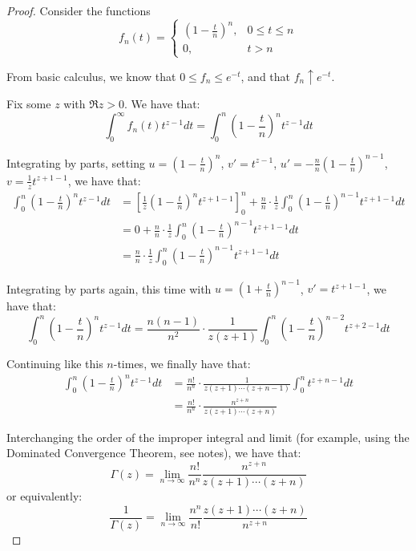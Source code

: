 \documentclass[11pt]{article} %
\theoremstyle{definition}
\theoremstyle{remark}
\begin{document}
\begin{proof}
Consider the functions
\[
f_n\left(t\right) =
\begin{cases}
\left(1-\frac{t}{n}\right)^n, & 0\leq t \leq n \\
0, & t > n
\end{cases}
\]

From basic calculus, we know that $0 \leq f_n \leq e^{-t}$, and that $f_n \uparrow e^{-t}$.

Fix some $z$ with $\Re z > 0$. We have that:
\[ \int _0^\infty f_n\left(t\right) t^{z-1} dt = \int_0^n \left(1- \frac{t}{n}\right)^n t^{z-1}dt \]

Integrating by parts, setting $u = \left(1 - \frac{t}{n}\right)^n$, $v' = t^{z-1}$, $u' = -\frac{n}{n}\left(1-\frac{t}{n}\right)^{n-1}$, $v = \frac{1}{z}t^{z+1-1}$, we have that:
\[
\begin{split}    
\int_0^n \left(1-\frac{t}{n}\right)^n t^{z-1} dt & = \left[\frac{1}{z}\left(1-\frac{t}{n}\right)^nt^{z+1 -1}\right]_0^n + \frac{n}{n}\cdot\frac{1}{z}\int_0^n \left(1-\frac{t}{n}\right)^{n-1}t^{z+1-1}dt \\
& = 0 + \frac{n}{n}\cdot\frac{1}{z}\int_0^n \left(1-\frac{t}{n}\right)^{n-1}t^{z+1-1}dt \\
& = \frac{n}{n}\cdot\frac{1}{z}\int_0^n \left(1-\frac{t}{n}\right)^{n-1}t^{z+1-1}dt
\end{split}
\]

Integrating by parts again, this time with $u = \left(1 + \frac{t}{n}\right)^{n-1}$, $v' = t^{z+1-1}$, we have that:
\[ \int_0^n \left(1-\frac{t}{n}\right)^n t^{z-1} dt = \frac{n\left(n-1\right)}{n^2}\cdot\frac{1}{z\left(z+1\right)}\int_0^n \left(1-\frac{t}{n}\right)^{n-2}t^{z+2-1}dt \]

Continuing like this $n$-times, we finally have that:
\[
\begin{split}
\int_0^n \left(1-\frac{t}{n}\right)^n t^{z-1} dt &= \frac{n!}{n^n} \cdot \frac{1}{z\left(z+1\right)\cdots\left(z+n-1\right)}\int_0^n t^{z+n-1}dt \\
& = \frac{n!}{n^n} \cdot \frac{n^{z+n}}{z\left(z+1\right)\cdots\left(z+n\right)}
\end{split}
\]

Interchanging the order of the improper integral and limit (for example, using the Dominated Convergence Theorem, see notes), we have that:
\[ \Gamma\left(z\right) = \lim_{n\to\infty} \frac{n!}{n^n} \frac{n^{z+n}}{z\left(z+1\right)\cdots\left(z+n\right)} \] 
or equivalently:
\[ \frac{1}{\Gamma\left(z\right)} = \lim_{n\to \infty} \frac{n^n}{n!}\frac{z\left(z+1\right)\cdots\left(z+n\right)}{n^{z+n}} \]


\end{proof}
\end{document}

